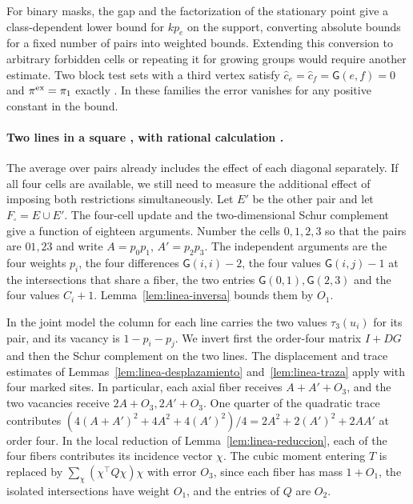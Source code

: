 For binary masks, the gap and the factorization of the stationary point give a class-dependent
lower bound for $kp_e$ on the support, converting absolute bounds for a fixed number of pairs into
weighted bounds. Extending this conversion to arbitrary forbidden cells or repeating it for
growing groups would require another estimate. Two block test sets with a third vertex satisfy
$\hat c_e=\hat c_f=\mathsf G(e,f)=0$ and $\pi^{\rm ex}=\pi_1$ exactly . In these families the
error vanishes for any positive constant in the bound.





\paragraph{Two lines in a square , with rational calculation
.}\label{par:cuadrado-racional}
The average over pairs already includes the effect of each diagonal separately. If all four cells
are available, we still need to measure the additional effect of imposing both restrictions
simultaneously. Let $E'$ be the other pair and let $F_\square=E\cup E'$. The four-cell update and
the two-dimensional Schur complement~\cite{hj} give a function of eighteen arguments. Number the
cells $0,1,2,3$ so that the pairs are $01,23$ and write $A=p_0p_1$, $A'=p_2p_3$. The independent
arguments are the four weights $p_i$, the four differences $\mathsf G(i,i)-2$, the four values
$\mathsf G(i,j)-1$ at the intersections that share a fiber, the two entries $\mathsf
G(0,1),\mathsf G(2,3)$ and the four values $C_i+1$. Lemma~\ref{lem:linea-inversa} bounds them by
$O_1$.

In the joint model the column for each line carries the two values $\tau_3(u_i)$ for its pair, and
its vacancy is $1-p_i-p_j$. We invert first the order-four matrix $I+DG$ and then the Schur
complement on the two lines. The displacement and trace estimates of
Lemmas~\ref{lem:linea-desplazamiento} and~\ref{lem:linea-traza} apply with four marked sites. In
particular, each axial fiber receives $A+A'+O_3$, and the two vacancies receive $2A+O_3,2A'+O_3$.
One quarter of the quadratic trace contributes $(4(A+A')^2+4A^2+4(A')^2)/4=2A^2+2(A')^2+2AA'$ at
order four. In the local reduction of Lemma~\ref{lem:linea-reduccion}, each of the four fibers
contributes its incidence vector $\chi$. The cubic moment entering $T$ is replaced by
$\sum_\chi(\chi^\top Q\chi)\chi$ with error $O_3$, since each fiber has mass $1+O_1$, the isolated
intersections have weight $O_1$, and the entries of $Q$ are $O_2$.

